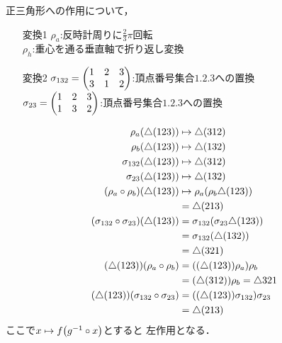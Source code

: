 \documentclass[main]{subfiles}
\begin{document}
		\begin{ex}
			正三角形への作用について，%
			\begin{itemize}
				\item[変換1] $\rho_a$:反時計周りに$\frac{2}{3}\pi$回転\\$\rho_h$:重心を通る垂直軸で折り返し変換
				\item[変換2] $\sigma_{132}=\mqty(1&2&3\\3&1&2)$:頂点番号集合$\qty{1,2,3}$への置換\\$\sigma_{23}=\mqty(1&2&3\\1&3&2)$:頂点番号集合$\qty{1,2,3}$への置換
			\end{itemize}
			\begin{align*}
				\rho_a\qty(\triangle\qty(123))                             & \mapsto\triangle\qty(312)                              \\
				\rho_b\qty(\triangle\qty(123))                             & \mapsto\triangle\qty(132)                              \\
				\sigma_{132}\qty(\triangle\qty(123))                       & \mapsto\triangle\qty(312)                              \\
				\sigma_{23}\qty(\triangle\qty(123))                        & \mapsto\triangle\qty(132)                              \\
				\qty(\rho_a\circ\rho_b)\qty(\triangle\qty(123))            & \mapsto\rho_a\qty(\rho_b\triangle\qty(123))            \\
				                                                           & =\triangle\qty(213)                                    \\
				\qty(\sigma_{132}\circ\sigma_{23})\qty(\triangle\qty(123)) & =\sigma_{132}\qty(\sigma_{23}\triangle\qty(123))       \\
				                                                           & =\sigma_{132}\qty(\triangle\qty(132))                  \\
				                                                           & =\triangle\qty(321)                                    \\
				\qty(\triangle\qty(123))\qty(\rho_a\circ\rho_b)            & =\qty(\qty(\triangle\qty(123))\rho_a)\rho_b            \\
				                                                           & =\qty(\triangle\qty(312))\rho_b=\triangle 321          \\
				\qty(\triangle\qty(123))\qty(\sigma_{132}\circ\sigma_{23}) & =\qty(\qty(\triangle\qty(123))\sigma_{132})\sigma_{23} \\
				                                                           & =\triangle\qty(213)
			\end{align*}
			ここで$x\mapsto f\qty(g^{-1}\circ x)$とすると{\color{red} 左作用}となる．
		\end{ex}
\end{document}

